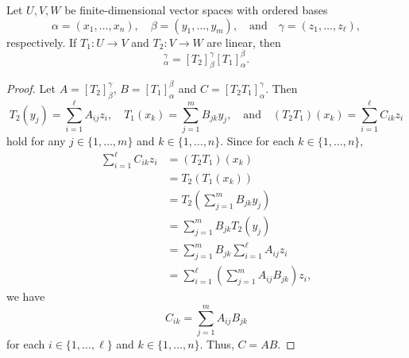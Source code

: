 \begin{theorem}
  \label{thm:matrix-multiplication}
  Let $U, V, W$ be finite-dimensional vector spaces with ordered bases
  \begin{equation*}
    \alpha = (x_1, \dots, x_n),
    \quad
    \beta = (y_1, \dots, y_m),
    \quad \text{and} \quad
    \gamma = (z_1, \dots, z_\ell),
  \end{equation*}
  respectively.
  If $T_1: U \to V$ and $T_2: V \to W$ are linear, then
  \begin{equation*}
    [T_2T_1]_\alpha^\gamma = [T_2]_\beta^\gamma [T_1]_\alpha^\beta.
  \end{equation*}
\end{theorem}
\begin{proof}
  Let $A = [T_2]_\beta^\gamma$, $B = [T_1]_\alpha^\beta$ and
  $C = [T_2T_1]_\alpha^\gamma$.
  Then
  \begin{equation*}
    T_2(y_j) = \sum_{i=1}^\ell A_{ij}z_i,
    \quad
    T_1(x_k) = \sum_{j=1}^m B_{jk}y_j,
    \quad \text{and} \quad
    (T_2T_1)(x_k) = \sum_{i=1}^\ell C_{ik}z_i
  \end{equation*}
  hold for any $j \in \{1, \dots, m\}$ and $k \in \{1, \dots, n\}$.
  Since for each $k \in \{1, \dots, n\}$,
  \begin{align*}
    \sum_{i=1}^\ell C_{ik}z_i
    &= (T_2T_1)(x_k) \\
    &= T_2(T_1(x_k)) \\
    &= T_2\left(\sum_{j=1}^m B_{jk}y_j\right) \\
    &= \sum_{j=1}^m B_{jk} T_2(y_j) \\
    &= \sum_{j=1}^m B_{jk} \sum_{i=1}^\ell A_{ij}z_i \\
    &= \sum_{i=1}^\ell \left(\sum_{j=1}^m A_{ij}B_{jk}\right)z_i,
  \end{align*}
  we have
  \begin{equation*}
    C_{ik} = \sum_{j=1}^m A_{ij}B_{jk}
  \end{equation*}
  for each $i \in \{1, \dots, \ell\}$ and $k \in \{1, \dots, n\}$.
  Thus, $C = AB$.
\end{proof}


